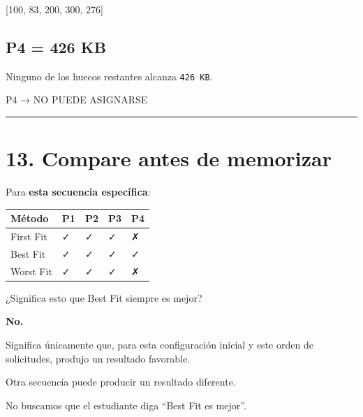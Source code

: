 \documentclass[
  spanish,
  letterpaper,
]{scrbook}
\newenvironment{Shaded}{\begin{snugshade}}{\end{snugshade}}
\newcommand{\NormalTok}[1]{\textcolor[rgb]{0.00,0.23,0.31}{#1}}
\newcounter{none} %
\begin{document}
\begin{Shaded}
\begin{Highlighting}[]
\NormalTok{[100, 83, 200, 300, 276]}
\end{Highlighting}
\end{Shaded}

\section{P4 = 426 KB}\label{p4-426-kb-2}

Ninguno de los huecos restantes alcanza \texttt{426\ KB}.

\begin{Shaded}
\begin{Highlighting}[]
\NormalTok{P4 → NO PUEDE ASIGNARSE}
\end{Highlighting}
\end{Shaded}

\begin{center}\rule{0.5\linewidth}{0.5pt}\end{center}


\chapter{13. Compare antes de
memorizar}\label{compare-antes-de-memorizar}

Para \textbf{esta secuencia específica}:

{\def\LTcaptype{none} %
\begin{longtable}[]{@{}lllll@{}}
\toprule\noalign{}
Método & P1 & P2 & P3 & P4 \\
\midrule\noalign{}
\endhead
\bottomrule\noalign{}
\endlastfoot
First Fit & ✓ & ✓ & ✓ & ✗ \\
Best Fit & ✓ & ✓ & ✓ & ✓ \\
Worst Fit & ✓ & ✓ & ✓ & ✗ \\
\end{longtable}
}

¿Significa esto que Best Fit siempre es mejor?

\textbf{No.}

Significa únicamente que, para esta configuración inicial y este orden
de solicitudes, produjo un resultado favorable.

Otra secuencia puede producir un resultado diferente.

No buscamos que el estudiante diga ``Best Fit es mejor''.
\end{document}
